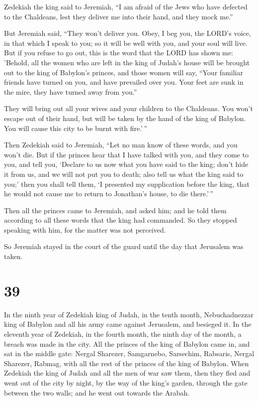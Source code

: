  Zedekiah the king said to Jeremiah, ``I am afraid of the
Jews who have defected to the Chaldeans, lest they deliver me into their
hand, and they mock me.''

 But Jeremiah said, ``They won't deliver you. Obey, I beg
you, the LORD's voice, in that which I speak to you; so it will be well
with you, and your soul will live.  But if you refuse to go
out, this is the word that the LORD has shown me:  'Behold,
all the women who are left in the king of Judah's house will be brought
out to the king of Babylon's princes, and those women will say, ``Your
familiar friends have turned on you, and have prevailed over you. Your
feet are sunk in the mire, they have turned away from you.''

 They will bring out all your wives and your children to
the Chaldeans. You won't escape out of their hand, but will be taken by
the hand of the king of Babylon. You will cause this city to be burnt
with fire.'\,''

 Then Zedekiah said to Jeremiah, ``Let no man know of these
words, and you won't die.  But if the princes hear that I
have talked with you, and they come to you, and tell you, `Declare to us
now what you have said to the king; don't hide it from us, and we will
not put you to death; also tell us what the king said to you;'
 then you shall tell them, `I presented my supplication
before the king, that he would not cause me to return to Jonathan's
house, to die there.'\,''

 Then all the princes came to Jeremiah, and asked him; and
he told them according to all these words that the king had commanded.
So they stopped speaking with him, for the matter was not perceived.

 So Jeremiah stayed in the court of the guard until the day
that Jerusalem was taken.

\hypertarget{section-38}{%
\section{39}\label{section-38}}

 In the ninth year of Zedekiah king of Judah, in the tenth
month, Nebuchadnezzar king of Babylon and all his army came against
Jerusalem, and besieged it.  In the eleventh year of
Zedekiah, in the fourth month, the ninth day of the month, a breach was
made in the city.  All the princes of the king of Babylon
came in, and sat in the middle gate: Nergal Sharezer, Samgarnebo,
Sarsechim, Rabsaris, Nergal Sharezer, Rabmag, with all the rest of the
princes of the king of Babylon.  When Zedekiah the king of
Judah and all the men of war saw them, then they fled and went out of
the city by night, by the way of the king's garden, through the gate
between the two walls; and he went out towards the Arabah.

